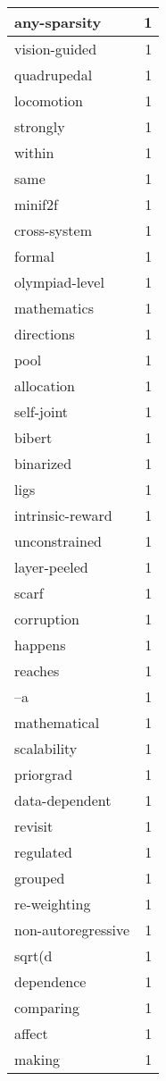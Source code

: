 \begin{table}[h]
\begin{tabular}{|l|r|}
\hline
any-sparsity & 1 \\
\hline
vision-guided & 1 \\
\hline
quadrupedal & 1 \\
\hline
locomotion & 1 \\
\hline
strongly & 1 \\
\hline
within & 1 \\
\hline
same & 1 \\
\hline
minif2f & 1 \\
\hline
cross-system & 1 \\
\hline
formal & 1 \\
\hline
olympiad-level & 1 \\
\hline
mathematics & 1 \\
\hline
directions & 1 \\
\hline
pool & 1 \\
\hline
allocation & 1 \\
\hline
self-joint & 1 \\
\hline
bibert & 1 \\
\hline
binarized & 1 \\
\hline
ligs & 1 \\
\hline
intrinsic-reward & 1 \\
\hline
unconstrained & 1 \\
\hline
layer-peeled & 1 \\
\hline
scarf & 1 \\
\hline
corruption & 1 \\
\hline
happens & 1 \\
\hline
reaches & 1 \\
\hline
--a & 1 \\
\hline
mathematical & 1 \\
\hline
scalability & 1 \\
\hline
priorgrad & 1 \\
\hline
data-dependent & 1 \\
\hline
revisit & 1 \\
\hline
regulated & 1 \\
\hline
grouped & 1 \\
\hline
re-weighting & 1 \\
\hline
non-autoregressive & 1 \\
\hline
sqrt(d & 1 \\
\hline
dependence & 1 \\
\hline
comparing & 1 \\
\hline
affect & 1 \\
\hline
making & 1 \\

\end{tabular}
\end{table}
